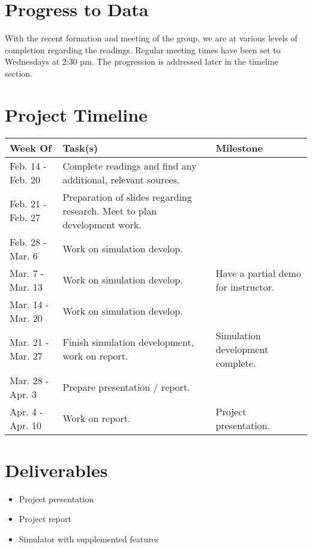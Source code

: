 \documentclass{article}
\begin{document}
\section{Progress to Data}

With the recent formation and meeting of the group, we are at various
levels of completion regarding the readings. Regular meeting times
have been set to Wednesdays at 2:30 pm. The progression is addressed
later in the timeline section.

\section{Project Timeline}

\begin{center}
  \begin{tabular}{l|p{8cm}|p{3cm}}
    Week Of & Task(s) & Milestone \\
    \hline
    Feb. 14 - Feb. 20 & Complete readings and find any additional, relevant sources. & \\
    Feb. 21 - Feb. 27 & Preparation of slides regarding research. Meet to plan development work. & \\
    Feb. 28 - Mar. 6 & Work on simulation develop. & \\
    Mar. 7 - Mar. 13 & Work on simulation develop. & Have a partial demo for instructor. \\
    Mar. 14 - Mar. 20 & Work on simulation develop. & \\
    Mar. 21 - Mar. 27 & Finish simulation development, work on report. & Simulation development complete. \\
    Mar. 28 - Apr. 3 & Prepare presentation / report. & \\
    Apr. 4 - Apr. 10 & Work on report. & Project presentation. \\
  \end{tabular}
\end{center}

\section{Deliverables}

\begin{itemize}
\item Project presentation
\item Project report
\item Simulator with supplemented features
\end{itemize}
\end{document}

